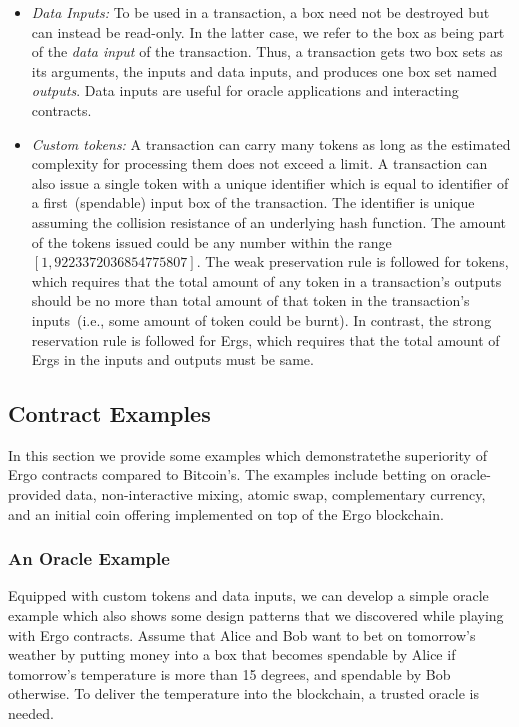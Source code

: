  \begin{itemize}
    \item {\em Data Inputs: }
 To be used in a transaction, a box need not be destroyed but can instead be read-only. In the latter case, we refer to the box as being part of the {\em data input} of the transaction. Thus, a transaction gets two box sets as its arguments, the inputs and
 data inputs, and produces one box set named {\em outputs}. Data inputs are useful for oracle applications and interacting contracts.

    \item {\em Custom tokens: }
 A transaction can carry many tokens as long as the estimated complexity for processing them does not exceed a limit. A transaction can also issue a single token with a unique identifier which is equal to identifier of a first~(spendable) input box of the transaction. The identifier is unique assuming the collision resistance of an underlying hash function. 
 The amount of the tokens issued could be any number within the range $[1, 9223372036854775807]$. The weak preservation rule is followed for tokens, which requires that the total amount of any token in a transaction's outputs should be no more
 than total amount of that token in the transaction's inputs~(i.e., some amount of token could be burnt). In contrast, the strong reservation rule is followed for Ergs, which requires that the total amount of Ergs in the inputs and outputs must be same.
 \end{itemize}

\subsection{Contract Examples}
\label{sec:examples}

 In this section we provide some examples which demonstratethe superiority of Ergo contracts compared to Bitcoin's. The examples include betting on oracle-provided data, non-interactive mixing, atomic swap, complementary currency, and an initial coin offering implemented on top of the Ergo blockchain.

 \subsubsection{An Oracle Example}
 \label{sec:platform}

 Equipped with custom tokens and data inputs, we can develop a simple oracle example which also shows some design patterns that we discovered while playing with Ergo contracts. Assume that Alice and Bob want to bet on tomorrow's weather by putting money into a box that becomes spendable by Alice if tomorrow's temperature is more than 15 degrees, and spendable by Bob otherwise. To deliver the temperature into the blockchain, a trusted oracle is needed.

